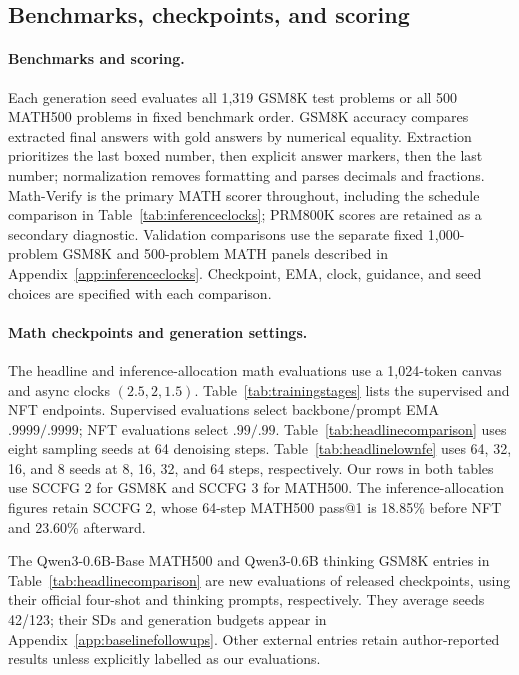 \documentclass{article}
\newcommand{\revp}[1]{\par\color{blue}#1\par\color{black}}
\begin{document}
\subsection{Benchmarks, checkpoints, and scoring}

\paragraph{Benchmarks and scoring.}
Each generation seed evaluates all 1,319 GSM8K test problems or all 500 MATH500 problems in fixed benchmark order. GSM8K accuracy compares extracted final answers with gold answers by numerical equality. Extraction prioritizes the last boxed number, then explicit answer markers, then the last number; normalization removes formatting and parses decimals and fractions. Math-Verify is the primary MATH scorer throughout, including the schedule comparison in Table~\ref{tab:inferenceclocks}; PRM800K scores are retained as a secondary diagnostic. Validation comparisons use the separate fixed 1,000-problem GSM8K and 500-problem MATH panels described in Appendix~\ref{app:inferenceclocks}. Checkpoint, EMA, clock, guidance, and seed choices are specified with each comparison.

\paragraph{Math checkpoints and generation settings.}
The headline and inference-allocation math evaluations use a 1,024-token canvas and async clocks $(2.5,2,1.5)$. Table~\ref{tab:trainingstages} lists the supervised and NFT endpoints. Supervised evaluations select backbone/prompt EMA $.9999/.9999$; NFT evaluations select $.99/.99$. Table~\ref{tab:headlinecomparison} uses eight sampling seeds at 64 denoising steps. Table~\ref{tab:headlinelownfe} uses 64, 32, 16, and 8 seeds at 8, 16, 32, and 64 steps, respectively. Our rows in both tables use SCCFG 2 for GSM8K and SCCFG 3 for MATH500. The inference-allocation figures retain SCCFG 2, whose 64-step MATH500 pass@1 is 18.85\% before NFT and 23.60\% afterward.

\revp{The Qwen3-0.6B-Base MATH500 and Qwen3-0.6B thinking GSM8K entries in Table~\ref{tab:headlinecomparison} are new evaluations of released checkpoints, using their official four-shot and thinking prompts, respectively. They average seeds 42/123; their SDs and generation budgets appear in Appendix~\ref{app:baselinefollowups}. Other external entries retain author-reported results unless explicitly labelled as our evaluations.}
\end{document}
